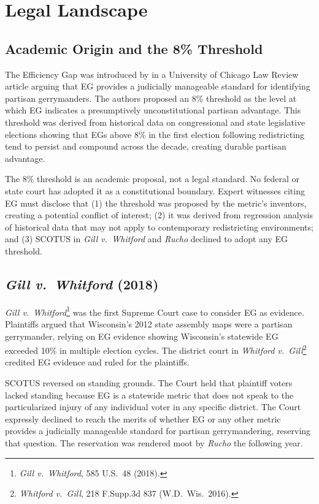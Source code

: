 \section{Legal Landscape}
\label{sec:legal}

\subsection{Academic Origin and the 8\% Threshold}

The Efficiency Gap was introduced by \citet{stephanopoulosMcGhee2015} in a
University of Chicago Law Review article arguing that EG provides a judicially
manageable standard for identifying partisan gerrymanders. The authors proposed
an 8\% threshold as the level at which EG indicates a presumptively unconstitutional
partisan advantage. This threshold was derived from historical data on congressional
and state legislative elections showing that EGs above 8\% in the first election
following redistricting tend to persist and compound across the decade, creating
durable partisan advantage.

The 8\% threshold is an academic proposal, not a legal standard. No federal or
state court has adopted it as a constitutional boundary. Expert witnesses citing
EG must disclose that (1) the threshold was proposed by the metric's inventors,
creating a potential conflict of interest; (2) it was derived from regression
analysis of historical data that may not apply to contemporary redistricting
environments; and (3) SCOTUS in \textit{Gill v.\ Whitford} and \textit{Rucho}
declined to adopt any EG threshold.

\subsection{\textit{Gill v.\ Whitford} (2018)}

\textit{Gill v.\ Whitford}\footnote{\textit{Gill v.\ Whitford}, 585 U.S.\ 48 (2018).}
was the first Supreme Court case to consider EG as evidence. Plaintiffs argued
that Wisconsin's 2012 state assembly maps were a partisan gerrymander, relying
on EG evidence showing Wisconsin's statewide EG exceeded 10\% in multiple election
cycles. The district court in \textit{Whitford v.\ Gill}\footnote{\textit{Whitford
v.\ Gill}, 218 F.Supp.3d 837 (W.D.\ Wis.\ 2016).} credited EG evidence and ruled
for the plaintiffs.

SCOTUS reversed on standing grounds. The Court held that plaintiff voters lacked
standing because EG is a statewide metric that does not speak to the particularized
injury of any individual voter in any specific district. The Court expressly declined
to reach the merits of whether EG or any other metric provides a judicially manageable
standard for partisan gerrymandering, reserving that question. The reservation was
rendered moot by \textit{Rucho} the following year.

